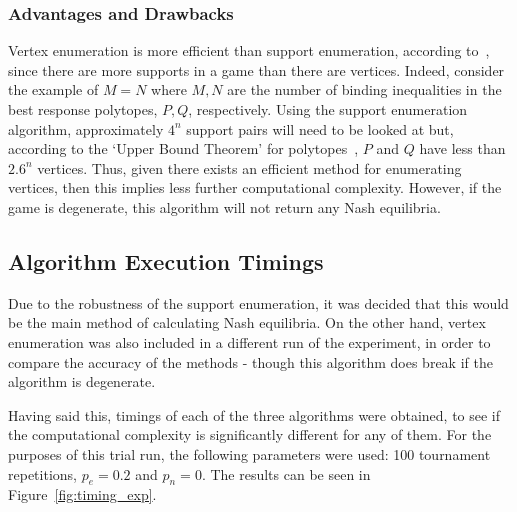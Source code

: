 \subsubsection{Advantages and Drawbacks}\label{subsubsec:Adv_and_Drawbacks}
Vertex enumeration is more efficient than support enumeration, according
to~\cite{NoamNisan2007}, since there are more supports in a game than there are
vertices. Indeed, consider the example of \(M = N\) where \(M, N\) are the
number of binding inequalities in the best response polytopes, \(P, Q\),
respectively. Using the support enumeration algorithm, approximately \(4^{n}\)
support pairs will need to be looked at but, according to the `Upper Bound
Theorem' for polytopes~\cite{Seidel1995, Alon1985, Brondsted2012}, \(P\) and \(Q\) have less than \(2.6^{n}\) vertices.
Thus, given there exists an efficient method for enumerating vertices, then this
implies less further computational complexity.  However, if the game is
degenerate, this algorithm will not return any Nash equilibria. %


\subsection{Algorithm Execution Timings}\label{subsec:Alg_Execution_Times}
Due to the robustness of the support enumeration, it was decided that this would
be the main method of calculating Nash equilibria. On the other hand, vertex
enumeration was also included in a different run of the experiment, in order to
compare the accuracy of the methods - though this algorithm does break if the
algorithm is degenerate. 

Having said this, timings of each of the three algorithms were obtained, to see
if the computational complexity is significantly different for any of them. For
the purposes of this trial run, the following parameters were used: 100
tournament repetitions, \(p_{e} = 0.2\) and \(p_{n} = 0\). The results can be
seen in Figure~\ref{fig:timing_exp}.

